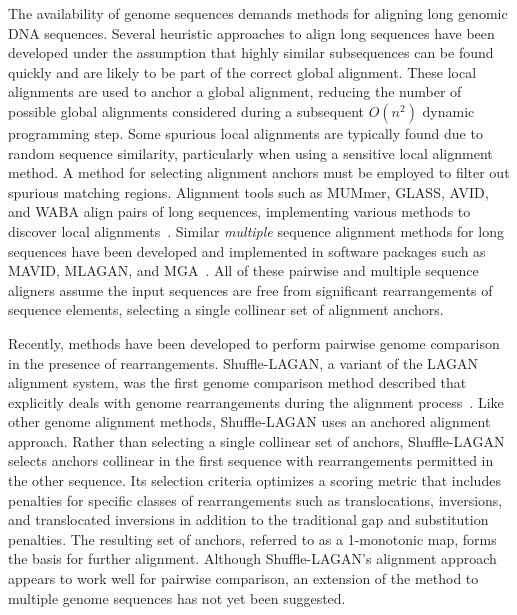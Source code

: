 \documentclass[titlepage,11pt]{article}
\begin{document}
The availability of genome sequences demands methods for aligning long genomic
DNA sequences.  Several heuristic approaches to align long sequences have been
developed under the assumption that highly similar subsequences can be found
quickly and are likely to be part of the correct global alignment.  These local
alignments are used to anchor a global alignment, reducing the number of
possible global alignments considered during a subsequent $O(n^2)$ dynamic
programming step.  Some spurious local alignments are typically found due to
random sequence similarity, particularly when using a sensitive local alignment
method.  A method for selecting alignment anchors must be
employed to filter out spurious matching regions. Alignment tools such as
MUMmer, GLASS, AVID, and WABA align pairs of long sequences,
implementing various methods to discover local
alignments~\citep{avid,glass,mummer,waba,segmentgenomic}. Similar
\textit{multiple} sequence alignment methods for long sequences have been developed and
implemented in software packages such as MAVID,
MLAGAN, and MGA~\citep{mga,mavid,lagan}.  All of these pairwise and multiple sequence
aligners assume the input sequences
are free from significant rearrangements of sequence elements,
selecting a single collinear set of alignment anchors.

Recently, methods have been developed to perform pairwise genome comparison in
the presence of rearrangements.  
Shuffle-LAGAN, a variant of the LAGAN alignment
system, was the first genome comparison
method described that explicitly deals with genome rearrangements during the
alignment process~\citep{slagan}.  Like other genome alignment methods, Shuffle-LAGAN uses an
anchored alignment approach.  Rather than selecting a single collinear set of
anchors, Shuffle-LAGAN selects anchors collinear in the first sequence
with rearrangements permitted in the other sequence.  Its selection criteria
optimizes a scoring metric that includes penalties for specific classes of
rearrangements such as translocations, inversions, and translocated inversions
in addition to the traditional gap and substitution penalties.  The resulting
set of anchors, referred to as a 1-monotonic map, forms the basis for further
alignment.  Although Shuffle-LAGAN's alignment approach appears to work well for
pairwise comparison, an extension of the method to multiple genome sequences has
not yet been suggested.
\end{document}
